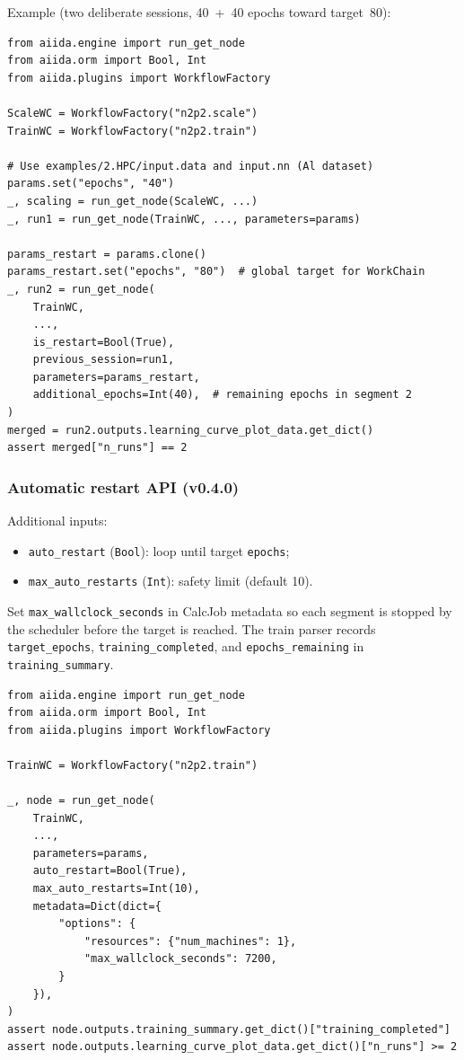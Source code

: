 Example (two deliberate sessions, 40~+~40 epochs toward target~80):
\begin{lstlisting}
from aiida.engine import run_get_node
from aiida.orm import Bool, Int
from aiida.plugins import WorkflowFactory

ScaleWC = WorkflowFactory("n2p2.scale")
TrainWC = WorkflowFactory("n2p2.train")

# Use examples/2.HPC/input.data and input.nn (Al dataset)
params.set("epochs", "40")
_, scaling = run_get_node(ScaleWC, ...)
_, run1 = run_get_node(TrainWC, ..., parameters=params)

params_restart = params.clone()
params_restart.set("epochs", "80")  # global target for WorkChain
_, run2 = run_get_node(
    TrainWC,
    ...,
    is_restart=Bool(True),
    previous_session=run1,
    parameters=params_restart,
    additional_epochs=Int(40),  # remaining epochs in segment 2
)
merged = run2.outputs.learning_curve_plot_data.get_dict()
assert merged["n_runs"] == 2
\end{lstlisting}

\subsubsection{Automatic restart API (v0.4.0)}
\label{subsubsec:auto-restart}

Additional inputs:

\begin{itemize}
  \item \texttt{auto\_restart} (\texttt{Bool}): loop until target \texttt{epochs};
  \item \texttt{max\_auto\_restarts} (\texttt{Int}): safety limit (default 10).
\end{itemize}

Set \texttt{max\_wallclock\_seconds} in CalcJob metadata so each segment is
stopped by the scheduler before the target is reached.
The train parser records \texttt{target\_epochs}, \texttt{training\_completed},
and \texttt{epochs\_remaining} in \texttt{training\_summary}.

\begin{lstlisting}
from aiida.engine import run_get_node
from aiida.orm import Bool, Int
from aiida.plugins import WorkflowFactory

TrainWC = WorkflowFactory("n2p2.train")

_, node = run_get_node(
    TrainWC,
    ...,
    parameters=params,
    auto_restart=Bool(True),
    max_auto_restarts=Int(10),
    metadata=Dict(dict={
        "options": {
            "resources": {"num_machines": 1},
            "max_wallclock_seconds": 7200,
        }
    }),
)
assert node.outputs.training_summary.get_dict()["training_completed"]
assert node.outputs.learning_curve_plot_data.get_dict()["n_runs"] >= 2
\end{lstlisting}

